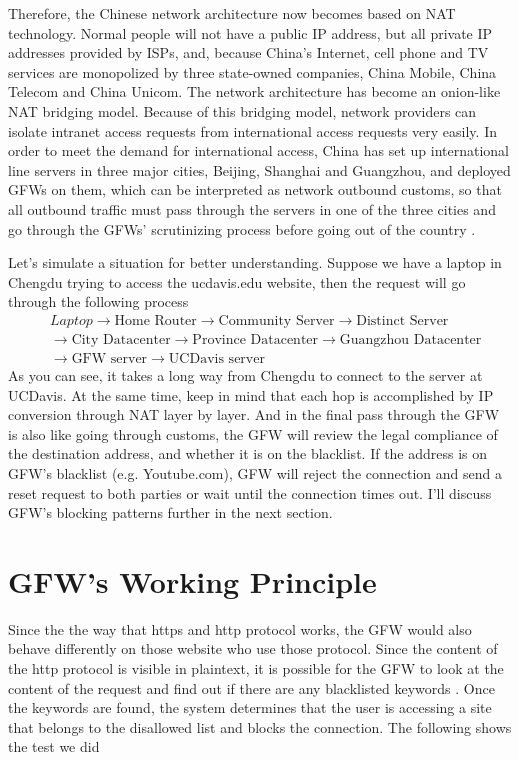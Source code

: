 \documentclass[11pt]{article}
\begin{document}
Therefore, the Chinese network architecture now becomes based on NAT technology.
Normal people will not have a public IP address, but all private IP
addresses provided by ISPs, and, because China's Internet, cell phone and TV
services are monopolized by three state-owned companies, China Mobile, China
Telecom and China Unicom. The network architecture has become an onion-like NAT
bridging model. Because of this bridging model, network providers can isolate
intranet access requests from international access requests very easily. In
order to meet the demand for international access, China has set up
international line servers in three major cities, Beijing, Shanghai and
Guangzhou, and deployed GFWs on them, which can be interpreted as network
outbound customs, so that all outbound traffic must pass through the servers in
one of the three cities and go through the GFWs' scrutinizing process before
going out of the country \cite{GlobalNetServer}.

Let's simulate a situation for better understanding. Suppose we have a laptop in
Chengdu trying to access the ucdavis.edu website, then the request will go
through the following process
\begin{align*}  & Laptop \rightarrow \text{Home Router} \rightarrow
               \text{Community Server} \rightarrow \text{Distinct Server} \\ &\rightarrow
               \text{City Datacenter} \rightarrow \text{Province Datacenter} \rightarrow
               \text{Guangzhou Datacenter}                                \\ &\rightarrow \text{GFW server} \rightarrow
               \text{UCDavis server}\end{align*}
As you can see, it takes a long way from Chengdu to connect to the server at UCDavis.
At the same time, keep in mind that each hop is accomplished by IP conversion
through NAT layer by layer. And in the final pass through the GFW is also like
going through customs, the GFW will review the legal compliance of the
destination address, and whether it is on the blacklist. If the address is on
GFW's blacklist (e.g. Youtube.com), GFW will reject the connection and send a
reset request to both parties or wait until the connection times out. I'll
discuss GFW's blocking patterns further in the next section.

\section{GFW's Working Principle}
Since the the way that https and http protocol works, the GFW would also behave differently
on those website who use those protocol. Since the content of the http protocol
is visible in plaintext, it is possible for the GFW to look at the content of
the request and find out if there are any blacklisted keywords \cite{HTTPBlockSource}.
Once the keywords are found, the system determines that the user is accessing a
site that belongs to the disallowed list and blocks the connection. The
following shows the test we did
\end{document}
